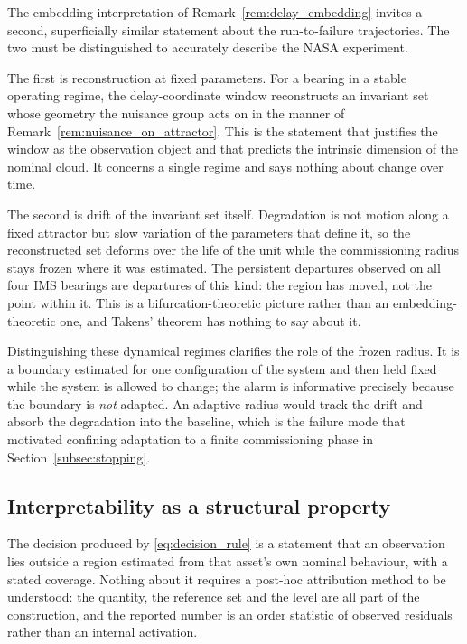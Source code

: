 \documentclass[a4paper]{cas-sc}
\begin{document}
The embedding interpretation of Remark~\ref{rem:delay_embedding} invites a second,
superficially similar statement about the run-to-failure trajectories. The
two must be distinguished to accurately describe the NASA experiment.

The first is reconstruction at fixed parameters. For a bearing in a stable
operating regime, the delay-coordinate window reconstructs an invariant set
whose geometry the nuisance group acts on in the manner of
Remark~\ref{rem:nuisance_on_attractor}. This is the statement that justifies
the window as the observation object and that predicts the intrinsic dimension
of the nominal cloud. It concerns a single regime and says nothing about
change over time.

The second is drift of the invariant set itself. Degradation is not motion
along a fixed attractor but slow variation of the parameters that define it,
so the reconstructed set deforms over the life of the unit while the
commissioning radius stays frozen where it was estimated. The persistent
departures observed on all four IMS bearings are departures of this kind: the
region has moved, not the point within it. This is a bifurcation-theoretic
picture rather than an embedding-theoretic one, and Takens' theorem has
nothing to say about it.

Distinguishing these dynamical regimes clarifies the role of the frozen radius. It is a
boundary estimated for one configuration of the system and then held fixed
while the system is allowed to change; the alarm is informative precisely
because the boundary is \emph{not} adapted. An adaptive radius would track the
drift and absorb the degradation into the baseline, which is the failure mode
that motivated confining adaptation to a finite commissioning phase in
Section~\ref{subsec:stopping}.

\subsection{Interpretability as a structural property}
\label{subsec:disc_interpretability}

The decision produced by \eqref{eq:decision_rule} is a statement that an
observation lies outside a region estimated from that asset's own nominal
behaviour, with a stated coverage. Nothing about it requires a post-hoc
attribution method to be understood: the quantity, the reference set and the
level are all part of the construction, and the reported number is an order
statistic of observed residuals rather than an internal activation.
\end{document}
